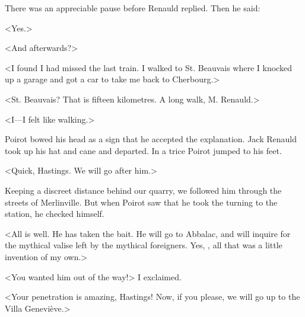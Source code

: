  There was an appreciable pause before Renauld replied. Then he said: 

 <Yes.> 

 <And afterwards?> 

 <I found I had missed the last train. I walked to St. Beauvais where I knocked up a garage and got a car to take me back to Cherbourg.> 

 <St. Beauvais? That is fifteen kilometres. A long walk, M. Renauld.> 

 <I—I felt like walking.> 

 Poirot bowed his head as a sign that he accepted the explanation. Jack Renauld took up his hat and cane and departed. In a trice Poirot jumped to his feet. 

 <Quick, Hastings. We will go after him.> 

 Keeping a discreet distance behind our quarry, we followed him through the streets of Merlinville. But when Poirot saw that he took the turning to the station, he checked himself. 

 <All is well. He has taken the bait. He will go to Abbalac, and will inquire for the mythical valise left by the mythical foreigners. Yes, , all that was a little invention of my own.> 

 <You wanted him out of the way!> I exclaimed. 

 <Your penetration is amazing, Hastings! Now, if you please, we will go up to the Villa Geneviève.>